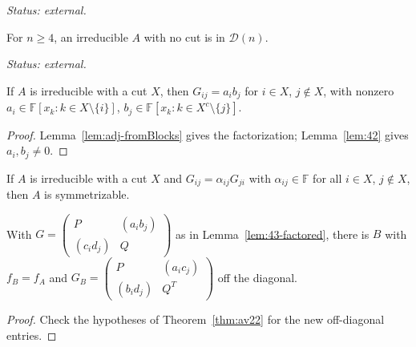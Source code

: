 \noindent\emph{Status: external.}

\begin{theorem}
\label{thm:loewy}
\leanok
{}
For $n\ge4$, an irreducible $A$ with no cut is in $\mathcal D(n)$.
\end{theorem}

\noindent\emph{Status: external.}

\begin{lemma}
\label{lem:43-factored}
\leanok
{}
If $A$ is irreducible with a cut $X$, then $G_{ij}=a_ib_j$ for $i\in X$, $j\notin X$, with
nonzero $a_i\in\mathbb F[x_k:k\in X\setminus\{i\}]$, $b_j\in\mathbb F[x_k:k\in X^c\setminus\{j\}]$.
\end{lemma}

\begin{proof}
Lemma~\ref{lem:adj-fromBlocks} gives the factorization; Lemma~\ref{lem:42} gives
$a_i,b_j\ne0$.
\end{proof}

\begin{lemma}
\label{lem:44}
\leanok
{}
If $A$ is irreducible with a cut $X$ and $G_{ij}=\alpha_{ij}G_{ji}$ with $\alpha_{ij}\in\mathbb F$
for all $i\in X$, $j\notin X$, then $A$ is symmetrizable.
\end{lemma}

\begin{lemma}
\label{lem:45}
\leanok
{}
With $G=\begin{pmatrix}P&(a_ib_j)\\(c_id_j)&Q\end{pmatrix}$ as in Lemma~\ref{lem:43-factored},
there is $B$ with $f_B=f_A$ and $G_B=\begin{pmatrix}P&(a_ic_j)\\(b_id_j)&Q^T\end{pmatrix}$ off
the diagonal.
\end{lemma}

\begin{proof}
Check the hypotheses of Theorem~\ref{thm:av22} for the new off-diagonal entries.
\end{proof}

